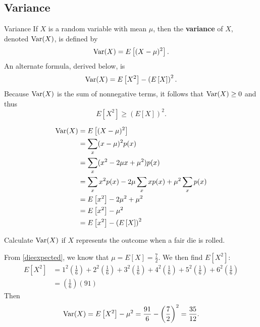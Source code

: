 \subsection{Variance}
\begin{bdef}{Variance}\label{variance}
    If $X$ is a random variable with mean $\mu$, then the \textbf{variance} of $X$, denoted $\operatorname{Var}(X)$, is defined by \[
        \operatorname{Var}(X) = E\left[ (X - \mu)^2 \right].    
    \] An alternate formula, derived below, is \[
        \operatorname{Var}(X) = E\left[ X^2 \right] - \left( E\left[ X \right] \right)^2.    
    \] Because $\operatorname{Var}(X)$ is the sum of nonnegative terms, it follows that $\operatorname{Var}(X) \geq 0$ and thus \[
        E\left[ X^2 \right] \geq \left( E\left[ X \right] \right)^2.    
    \]
\end{bdef}
\[
    \begin{aligned}
        \operatorname{Var}(X) &= E\left[ (X - \mu)^2 \right] \\
        &= \sum_x (x - \mu)^2p(x) \\
        &= \sum_x (x^2 - 2\mu x + \mu^2)p(x) \\
        &= \sum_x x^2p(x) - 2\mu\sum_x xp(x) + \mu^2\sum_x p(x) \\
        &= E\left[ x^2 \right] - 2\mu^2 + \mu^2 \\
        &= E\left[ x^2 \right] - \mu^2 \\
        &= E\left[ x^2 \right] - \left( E\left[ X \right] \right)^2
    \end{aligned}    
\]
\begin{changebar}
    \begin{example}
        Calculate $\operatorname{Var}(X)$ if $X$ represents the outcome when a fair die is rolled.
    \end{example}
    \begin{solution}
        From \autoref{dieexpected}, we know that $\mu = E\left[ X \right] = \frac{7}{2}.$ We then find $E\left[ X^2 \right]$: \[
            \begin{aligned}
                E\left[ X^2 \right] &= 1^2\left( \frac{1}{6} \right) + 2^2\left( \frac{1}{6} \right) + 3^2\left( \frac{1}{6} \right) + 4^2\left( \frac{1}{6} \right) + 5^2\left( \frac{1}{6} \right) + 6^2\left( \frac{1}{6} \right) \\
                &= \left( \frac{1}{6} \right)\left( 91 \right)
            \end{aligned}    
        \] Then \[
            \operatorname{Var}(X) = E\left[ X^2 \right] - \mu^2 = \frac{91}{6} - \left( \frac{7}{2} \right)^2 = \frac{35}{12}.     
        \]
    \end{solution}
\end{changebar}
